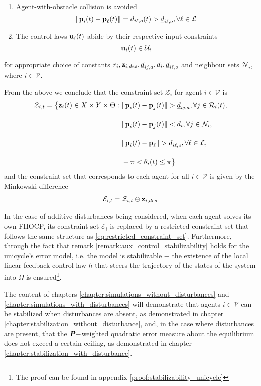 \begin{problem}
\begin{enumerate}
  \item Agent-with-obstacle collision is avoided
    $$ \|\bm{\mathbf{p}}_i(t) - \bm{\mathbf{p}}_{\ell}(t)\| = d_{i\ell,o} (t) > \underline{d}_{i\ell,o},
    \forall \ell \in \mathcal{L}$$

  \item The control laws $\bm{\mathbf{u}}_i(t)$ abide by their respective input constraints
    $$\bm{\mathbf{u}}_i(t) \in \mathcal{U}_i$$
\end{enumerate}

for appropriate choice of constants
$r_i,\bm{\mathbf{z}}_{i,des},\underline{d}_{ij,a}, d_i,\underline{d}_{i\ell,o}$ and
neighbour sets $\mathcal{N}_i$, where $i \in \mathcal{V}$.
\end{problem}

From the above we conclude that the constraint set $\mathcal{Z}_i$ for
agent $i \in \mathcal{V}$ is
\begin{align}
  \mathcal{Z}_{i,t} = \big\{\bm{\mathbf{z}}_i(t) \in X \times Y \times \Theta : \
      & \|\bm{\mathbf{p}}_i(t) - \bm{\mathbf{p}}_j(t)\| > \underline{d}_{ij,a}, \forall j \in \mathcal{R}_i(t), \\[2.5ex]
      & \|\bm{\mathbf{p}}_i(t) - \bm{\mathbf{p}}_j(t)\| < d_i, \forall j \in \mathcal{N}_i, \\[2.5ex]
      & \|\bm{\mathbf{p}}_i(t) - \bm{\mathbf{p}}_{\ell}\| > \underline{d}_{i\ell,o}, \forall \ell \in \mathcal{L}, \\[2.5ex]
      & - \pi < \theta_i(t) \leq \pi \big\}
\end{align}
and the constraint set that corresponds to each agent for all
$i \in \mathcal{V}$  is given by the Minkowski difference
\begin{align}
  \mathcal{E}_{i,t} = \mathcal{Z}_{i,t} \ominus \bm{\mathbf{z}}_{i,des}
  \label{eq:error_constraint_set_unicycle}
\end{align}

In the case of additive disturbances being considered, when each agent solves
its own FHOCP, its constraint set $\mathcal{E}_i$ is replaced by a
restricted constraint set that follows the same structure as
\eqref{eq:restricted_constraint_set}. Furthermore, through the fact that
remark \eqref{remark:aux_control_stabilizability} holds for the unicycle's
error model, i.e. the model is stabilizable $-$ the existence of the
local linear feedback control law $h$ that steers the trajectory of the
states of the system into $\Omega$ is ensured\footnote{The proof can be found
in appendix \eqref{proof:stabilizability_unicycle}}.

The content of chapters \ref{chapter:simulations_without_disturbances} and
\ref{chapter:simulations_with_disturbances} will demonstrate that agents
$i \in \mathcal{V}$ can be stabilized when disturbances are absent, as
demonstrated in chapter \ref{chapter:stabilization_without_disturbance}, and,
in the case where disturbances are present, that the $\bm{\mathit{P}}-$weighted
quadratic error measure about the equilibrium does not exceed a certain ceiling,
as demonstrated in chapter \ref{chapter:stabilization_with_disturbance}.

